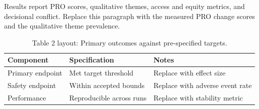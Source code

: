 
Results report PRO scores, qualitative themes, access and equity metrics, and decisional conflict. Replace this paragraph with the measured PRO change scores and the qualitative theme prevalence.

\begin{table}[H]
\caption{Table 2 layout: Primary outcomes against pre-specified targets.}
\label{tab:results_primary}
\centering
\begin{tabular}{>{\raggedright\arraybackslash}p{3.4cm} >{\raggedright\arraybackslash}p{4.6cm} >{\raggedright\arraybackslash}p{5.4cm}}
\toprule
\textbf{Component} & \textbf{Specification} & \textbf{Notes} \\
\midrule
  Primary endpoint & Met target threshold & Replace with effect size \\
  Safety endpoint & Within accepted bounds & Replace with adverse event rate \\
  Performance & Reproducible across runs & Replace with stability metric \\
\bottomrule
\end{tabular}
\end{table}
